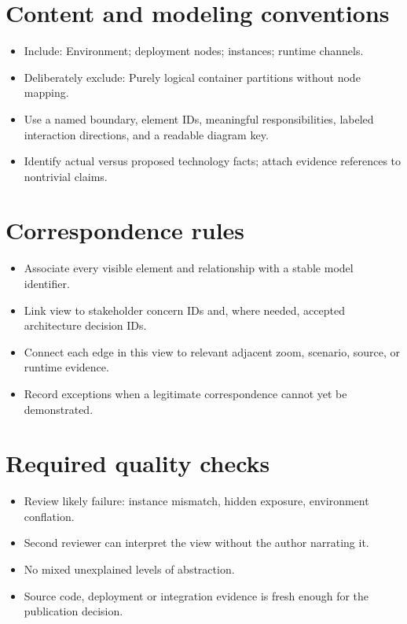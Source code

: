 \documentclass[10pt,letterpaper]{article}
\begin{document}
\section{Content and modeling conventions}
\begin{itemize}
\item Include: Environment; deployment nodes; instances; runtime channels.
\item Deliberately exclude: Purely logical container partitions without node mapping.
\item Use a named boundary, element IDs, meaningful responsibilities, labeled interaction directions, and a readable diagram key.
\item Identify actual versus proposed technology facts; attach evidence references to nontrivial claims.
\end{itemize}

\section{Correspondence rules}
\begin{itemize}
\item Associate every visible element and relationship with a stable model identifier.
\item Link view to stakeholder concern IDs and, where needed, accepted architecture decision IDs.
\item Connect each edge in this view to relevant adjacent zoom, scenario, source, or runtime evidence.
\item Record exceptions when a legitimate correspondence cannot yet be demonstrated.
\end{itemize}

\section{Required quality checks}
\begin{itemize}
\item Review likely failure: instance mismatch, hidden exposure, environment conflation.
\item Second reviewer can interpret the view without the author narrating it.
\item No mixed unexplained levels of abstraction.
\item Source code, deployment or integration evidence is fresh enough for the publication decision.
\end{itemize}
\end{document}
